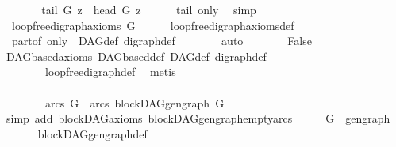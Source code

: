 \begin{isabellebody}
\ \ \ \ \isamarkupfalse%
\ \isamarkupfalse%
\ {\isachardoublequoteopen}tail\ G\ z\ {\isacharequal}{\kern0pt}\ head\ G\ z{\isachardoublequoteclose}\isanewline
\ \ \ \ \isamarkupfalse%
\ tail\ only\ \isamarkupfalse%
\ simp\isanewline
\ \ \isamarkupfalse%
\ \isamarkupfalse%
\ {\isachardoublequoteopen}{\isasymnot}\ loopfree{\isacharunderscore}{\kern0pt}digraph{\isacharunderscore}{\kern0pt}axioms\ G{\isachardoublequoteclose}\isanewline
\ \ \ \ \isamarkupfalse%
\ loopfree{\isacharunderscore}{\kern0pt}digraph{\isacharunderscore}{\kern0pt}axioms{\isacharunderscore}{\kern0pt}def\isanewline
\ \ \ \ \ \ \isamarkupfalse%
\ \ part{\isacharunderscore}{\kern0pt}of\ only\ \ DAG{\isacharunderscore}{\kern0pt}def\ digraph{\isacharunderscore}{\kern0pt}def\isanewline
\ \ \ \ \ \ \isamarkupfalse%
\ auto\isanewline
\ \ \ \ \isamarkupfalse%
\ \isamarkupfalse%
\ False\isanewline
\ \ \ \ \ \ \isamarkupfalse%
\ DAGbased{\isacharunderscore}{\kern0pt}axioms\ DAGbased{\isacharunderscore}{\kern0pt}def\ DAG{\isacharunderscore}{\kern0pt}def\ digraph{\isacharunderscore}{\kern0pt}def\isanewline
\ \ \ \ \ \ \ \ loopfree{\isacharunderscore}{\kern0pt}digraph{\isacharunderscore}{\kern0pt}def\ \isamarkupfalse%
\ metis\isanewline
\ \ \isamarkupfalse%
\ \ \ \ \ \ \ \ \ \ \ \ \ \ \ \ \ \ \ \ \ \ \ \ \ \ \ \ \ \ \ \ \ \ \ \ \ \ \ \ \ \ \ \ \ \ \ \ \ \ \ \ \ \ \ \ \ \ \ \ \ \ \ \ \ \ \ \ \ \ \ \ \ \ \isanewline
\ \ \isamarkupfalse%
\ \isamarkupfalse%
\ {\isachardoublequoteopen}arcs\ G\ {\isacharequal}{\kern0pt}\ arcs\ {\isacharparenleft}{\kern0pt}blockDAG{\isachardot}{\kern0pt}gen{\isacharunderscore}{\kern0pt}graph\ G{\isacharparenright}{\kern0pt}{\isachardoublequoteclose}\isanewline
\ \ \ \ \isamarkupfalse%
\ {\isacharparenleft}{\kern0pt}simp\ add{\isacharcolon}{\kern0pt}\ blockDAG{\isacharunderscore}{\kern0pt}axioms\ blockDAG{\isachardot}{\kern0pt}gen{\isacharunderscore}{\kern0pt}graph{\isacharunderscore}{\kern0pt}empty{\isacharunderscore}{\kern0pt}arcs{\isacharparenright}{\kern0pt}\isanewline
\ \ \isamarkupfalse%
\ \isamarkupfalse%
\ {\isachardoublequoteopen}G\ {\isacharequal}{\kern0pt}\ gen{\isacharunderscore}{\kern0pt}graph{\isachardoublequoteclose}\isanewline
\ \ \ \ \isamarkupfalse%
\ \ blockDAG{\isachardot}{\kern0pt}gen{\isacharunderscore}{\kern0pt}graph{\isacharunderscore}{\kern0pt}def\isanewline

\end{isabellebody}
